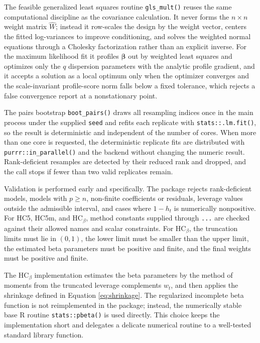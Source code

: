 The feasible generalized least squares routine \texttt{gls\_mult()} reuses the same computational discipline as the covariance calculation. It never forms the \(n\times n\) weight matrix \(\widehat W\); instead it row-scales the design by the weight vector, centers the fitted log-variances to improve conditioning, and solves the weighted normal equations through a Cholesky factorization rather than an explicit inverse. For the maximum likelihood fit it profiles \(\boldsymbol{\beta}\) out by weighted least squares and optimizes only the \(q\) dispersion parameters with the analytic profile gradient, and it accepts a solution as a local optimum only when the optimizer converges and the scale-invariant profile-score norm falls below a fixed tolerance, which rejects a false convergence report at a nonstationary point.

The pairs bootstrap \texttt{boot\_pairs()} draws all resampling indices once in the main process under the supplied \texttt{seed} and refits each replicate with \texttt{stats::.lm.fit()}, so the result is deterministic and independent of the number of cores. When more than one core is requested, the deterministic replicate fits are distributed with \texttt{purrr::in\_parallel()} and the  backend without changing the numeric result. Rank-deficient resamples are detected by their reduced rank and dropped, and the call stops if fewer than two valid replicates remain.

Validation is performed early and specifically. The package rejects rank-deficient models, models with \(p \ge n\), non-finite coefficients or residuals, leverage values outside the admissible interval, and cases where \(1-h_t\) is numerically nonpositive. For HC5, HC5m, and \(\text{HC}_\beta\), method constants supplied through \texttt{...} are checked against their allowed names and scalar constraints. For \(\text{HC}_\beta\), the truncation limits must lie in \((0,1)\), the lower limit must be smaller than the upper limit, the estimated beta parameters must be positive and finite, and the final weights must be positive and finite.

The \(\text{HC}_\beta\) implementation estimates the beta parameters by the method of moments from the truncated leverage complements \(w_t\), and then applies the shrinkage defined in Equation \eqref{eq:shrinkage}. The regularized incomplete beta function is not reimplemented in the package; instead, the numerically stable base R routine \texttt{stats::pbeta()} is used directly. This choice keeps the implementation short and delegates a delicate numerical routine to a well-tested standard library function.

